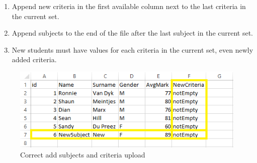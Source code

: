 \begin{itemize}
\begin{enumerate}
\begin{enumerate}
		\item Append new criteria in the first available column next to the last criteria in the current set.
		\item Append subjects to the end of the file after the last subject in the current set.
		\item New students must have values for each criteria in the current set, even newly added criteria.
	\end{enumerate}
\end{enumerate}
	\begin{figure}[H] 
	\centering
	\includegraphics[width=13cm]{./graphics/AddSubCrit.png}\par
	\caption{Correct add subjects and criteria upload}
	\end{figure}

\end{itemize}


